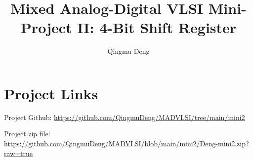 \documentclass[11pt]{article}
\begin{document}
\title{Mixed Analog-Digital VLSI Mini-Project II: 4-Bit Shift Register}
\author{Qingmu Deng}
\maketitle %

\section*{Project Links}

Project Github: \href{https://github.com/QingmuDeng/MADVLSI/tree/main/mini2}{https://github.com/QingmuDeng/MADVLSI/tree/main/mini2}

\noindent
Project zip file: \href{https://github.com/QingmuDeng/MADVLSI/blob/main/mini2/Deng-mini2.zip?raw=true}{https://github.com/QingmuDeng/MADVLSI/blob/main/mini2/Deng-mini2.zip?raw=true}
\end{document}
